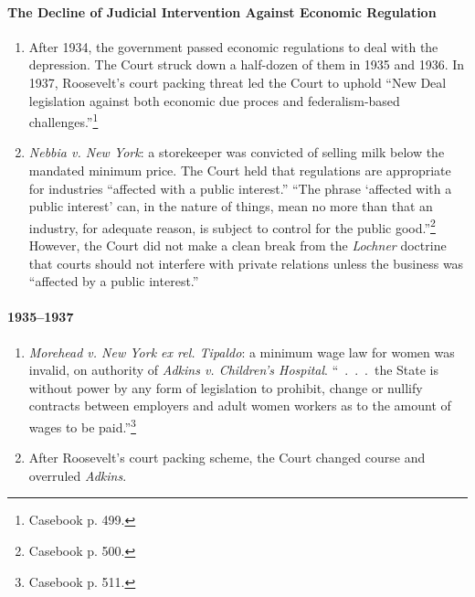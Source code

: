\paragraph{The Decline of Judicial Intervention Against Economic 
Regulation}

\begin{enumerate}
    \item After 1934, the government passed economic regulations to deal with 
    the depression. The Court struck down a half-dozen of them in 1935 and 
    1936. In 1937, Roosevelt's court packing threat led the Court to uphold 
    ``New Deal legislation against both economic due proces and 
    federalism-based challenges.''\footnote{Casebook p. 499.}
    \item \emph{Nebbia v. New York}: a storekeeper was convicted of selling 
    milk below the mandated minimum price. The Court held that regulations are 
    appropriate for industries ``affected with a public interest.'' ``The 
    phrase `affected with a public interest' can, in the nature of things, 
    mean no more than that an industry, for adequate reason, is subject to 
    control for the public good.''\footnote{Casebook p. 500.} However, the 
    Court did not make a clean break from the \emph{Lochner} doctrine that 
    courts should not interfere with private relations unless the business was 
    ``affected by a public interest.''
\end{enumerate}

\paragraph{1935--1937}

\begin{enumerate}
    \item \emph{Morehead v. New York ex rel. Tipaldo}: a minimum wage law for 
    women was invalid, on authority of \emph{Adkins v. Children's Hospital}. 
    ``~.~.~.~the State is without power by any form of legislation to 
    prohibit, change or nullify contracts between employers and adult women 
    workers as to the amount of wages to be paid.''\footnote{Casebook p. 511.}
    \item After Roosevelt's court packing scheme, the Court changed course and 
    overruled \emph{Adkins}.
\end{enumerate}

